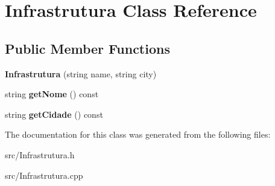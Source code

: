 \hypertarget{class_infrastrutura}{}\section{Infrastrutura Class Reference}
\label{class_infrastrutura}
\subsection*{Public Member Functions}
\begin{DoxyCompactItemize}
\item 
\hypertarget{class_infrastrutura_ac78bcb26b52106b69978b2f57221955a}{}{\bfseries Infrastrutura} (string name, string city)\label{class_infrastrutura_ac78bcb26b52106b69978b2f57221955a}

\item 
\hypertarget{class_infrastrutura_a14ba5d30c8ce9260d39be1dc7f2bb8c6}{}string {\bfseries get\+Nome} () const \label{class_infrastrutura_a14ba5d30c8ce9260d39be1dc7f2bb8c6}

\item 
\hypertarget{class_infrastrutura_af7dd3df24da0b2bf6a97d124fbfdc09c}{}string {\bfseries get\+Cidade} () const \label{class_infrastrutura_af7dd3df24da0b2bf6a97d124fbfdc09c}

\end{DoxyCompactItemize}


The documentation for this class was generated from the following files\+:\begin{DoxyCompactItemize}
\item 
src/Infrastrutura.\+h\item 
src/Infrastrutura.\+cpp\end{DoxyCompactItemize}
